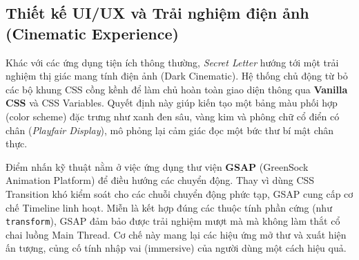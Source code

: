 \subsection{Thiết kế UI/UX và Trải nghiệm điện ảnh (Cinematic Experience)}
Khác với các ứng dụng tiện ích thông thường, \textit{Secret Letter} hướng tới một trải nghiệm thị giác mang tính điện ảnh (Dark Cinematic). Hệ thống chủ động từ bỏ các bộ khung CSS cồng kềnh để làm chủ hoàn toàn giao diện thông qua \textbf{Vanilla CSS} và CSS Variables. Quyết định này giúp kiến tạo một bảng màu phối hợp (color scheme) đặc trưng như xanh đen sâu, vàng kim và phông chữ cổ điển có chân (\textit{Playfair Display}), mô phỏng lại cảm giác đọc một bức thư bí mật chân thực.

Điểm nhấn kỹ thuật nằm ở việc ứng dụng thư viện \textbf{GSAP} (GreenSock Animation Platform) để điều hướng các chuyển động. Thay vì dùng CSS Transition khó kiểm soát cho các chuỗi chuyển động phức tạp, GSAP cung cấp cơ chế Timeline linh hoạt. Miễn là kết hợp đúng các thuộc tính phần cứng (như \texttt{transform}), GSAP đảm bảo được trải nghiệm mượt mà mà không làm thắt cổ chai luồng Main Thread. Cơ chế này mang lại các hiệu ứng mở thư và xuất hiện ấn tượng, củng cố tính nhập vai (immersive) của người dùng một cách hiệu quả.
